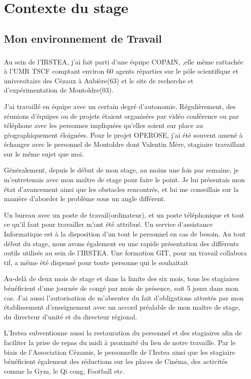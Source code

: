 \chapter{Contexte du stage}
\section{Mon environnement de Travail}
\paragraph{}
Au sein de l'IRSTEA, j'ai fait parti d'une équipe COPAIN, ,elle même rattachée à l'UMR TSCF comptant environ 60 agents  réparties sur le pôle scientifique et universitaire des Cézaux à Aubière(63) et le site de recherche et d'expérimentation de Montoldre(03).

J'ai travaillé en équipe avec un certain degré d'autonomie. Régulièrement, des réunions d'équipes ou de projets étaient organisées par vidéo conférence ou par téléphone avec les personnes impliquées qu'elles soient sur place au géographiquement éloignées. Pour le projet OPEROSE, j'ai été souvent amené à échanger avec le personnel de Montoldre dont Valentin Mère, stagiaire travaillant sur le même sujet que moi.

Généralement, depuis le début de mon stage, au moins une fois par semaine, je m'entretenais avec mon maître de stage pour faire le point. Je lui présentais mon état d'avancement ainsi que les obstacles rencontrés, et lui me conseillais sur la manière d'aborder le problème sous un angle différent.

Un bureau avec un poste de travail(ordinateur), et un poste téléphonique et tout ce qu'il faut pour travailler m'ont été attribué. Un service d'assistance Informatique est à la disposition d'un tout le personnel en cas de besoin. Au tout début du stage, nous avons également eu une rapide présentation des différents outils utilisés au sein de l'IRSTEA. Une formation GIT, pour un travail collabora tif, a même été dispensé pour toute personne qui le souhaitait 

Au-delà de deux mois de stage et dans la limite des six mois, tous les stagiaires bénéficient d'une journée de congé par mois de présence, soit 5 jours dans mon cas. J'ai aussi l'autorisation de m'absenter du fait d'obligations attestés par mon établissement d'enseignement avec un accord préalable de mon maître de stage, du directeur d'unité et du directeur régional.

L'Irstea subventionne aussi la restauration du personnel et des stagiaires afin de faciliter la prise de repas du midi à proximité du lieu de notre travaille. Par le biais de l'Association Cézamis, le personnelle de l'Irstea ainsi que les stagiaire bénéficient également des réductions sur les places de Cinéma, des activités comme la Gym, le Qi cong, Football etc.